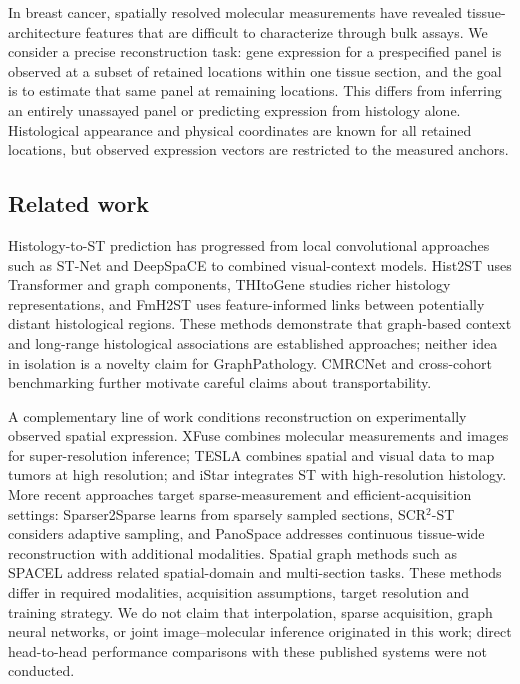 In breast cancer, spatially resolved molecular measurements have revealed tissue-architecture features that are difficult to characterize through bulk assays\cite{andersson2021,wu2021,bassiouni2023}. We consider a precise reconstruction task: gene expression for a prespecified panel is observed at a subset of retained locations within one tissue section, and the goal is to estimate that same panel at remaining locations. This differs from inferring an entirely unassayed panel or predicting expression from histology alone. Histological appearance and physical coordinates are known for all retained locations, but observed expression vectors are restricted to the measured anchors.

\subsection{Related work}
Histology-to-ST prediction has progressed from local convolutional approaches such as ST-Net\cite{he2020} and DeepSpaCE\cite{monjo2022} to combined visual-context models. Hist2ST uses Transformer and graph components\cite{hist2st2022}, THItoGene studies richer histology representations\cite{thitogene2024}, and FmH2ST uses feature-informed links between potentially distant histological regions\cite{fmh2st2025}. These methods demonstrate that graph-based context and long-range histological associations are established approaches; neither idea in isolation is a novelty claim for GraphPathology. CMRCNet\cite{liu2026} and cross-cohort benchmarking\cite{wang2025} further motivate careful claims about transportability.

A complementary line of work conditions reconstruction on experimentally observed spatial expression. XFuse combines molecular measurements and images for super-resolution inference\cite{bergenstrahle2022}; TESLA combines spatial and visual data to map tumors at high resolution\cite{tesla2023}; and iStar integrates ST with high-resolution histology\cite{istar2024}. More recent approaches target sparse-measurement and efficient-acquisition settings: Sparser2Sparse learns from sparsely sampled sections\cite{sparser2026}, SCR$^2$-ST considers adaptive sampling\cite{scr2st2026}, and PanoSpace addresses continuous tissue-wide reconstruction with additional modalities\cite{panospace2026}. Spatial graph methods such as SPACEL address related spatial-domain and multi-section tasks\cite{spacel2023}. These methods differ in required modalities, acquisition assumptions, target resolution and training strategy. We do not claim that interpolation, sparse acquisition, graph neural networks, or joint image--molecular inference originated in this work; direct head-to-head performance comparisons with these published systems were not conducted.


